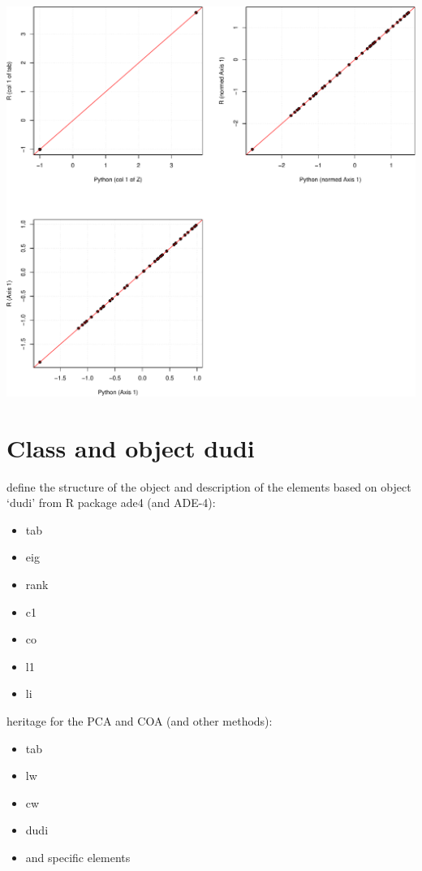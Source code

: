 \documentclass[
  10pt,
]{article}
\providecommand{\tightlist}{%
  \setlength{\itemsep}{0pt}\setlength{\parskip}{0pt}}
\begin{document}
\includegraphics{RandPytonAnalysisPDF_files/figure-latex/unnamed-chunk-38-1.pdf}

\hypertarget{class-and-object-dudi}{%
\section{Class and object dudi}\label{class-and-object-dudi}}

define the structure of the object and description of the elements based
on object `dudi' from R package ade4 (and ADE-4):

\begin{itemize}
\tightlist
\item
  tab
\item
  eig
\item
  rank
\item
  c1
\item
  co
\item
  l1
\item
  li
\end{itemize}

heritage for the PCA and COA (and other methods):

\begin{itemize}
\tightlist
\item
  tab
\item
  lw
\item
  cw
\item
  dudi
\item
  and specific elements
\end{itemize}
\end{document}
